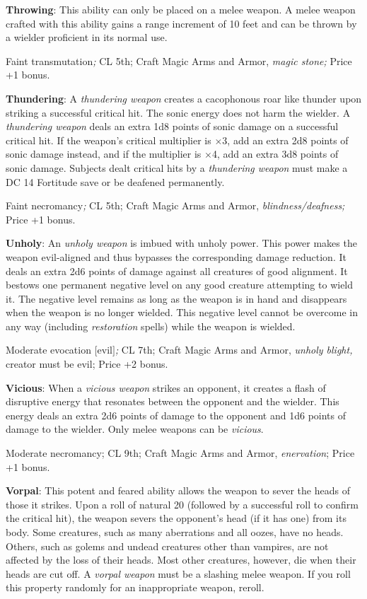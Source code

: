 \textbf{Throwing}: This ability can only be placed on a melee weapon. A melee weapon crafted with this ability gains a range increment of 10 feet and can be thrown by a wielder proficient in its normal use.
				
Faint transmutation\textit{; }CL 5th; Craft Magic Arms and Armor, \textit{magic stone; }Price +1 bonus.
				
\textbf{Thundering}: A \textit{thundering weapon} creates a cacophonous roar like thunder upon striking a successful critical hit. The sonic energy does not harm the wielder. A \textit{thundering weapon} deals an extra 1d8 points of sonic damage on a successful critical hit. If the weapon's critical multiplier is \mbox{$\times$}3, add an extra 2d8 points of sonic damage instead, and if the multiplier is \mbox{$\times$}4, add an extra 3d8 points of sonic damage. Subjects dealt critical hits by a \textit{thundering weapon} must make a DC 14 Fortitude save or be deafened permanently.
				
Faint necromancy\textit{; }CL 5th; Craft Magic Arms and Armor, \textit{blindness/deafness; }Price +1 bonus.
				
\textbf{Unholy}: An \textit{unholy weapon} is imbued with unholy power. This power makes the weapon evil-aligned and thus bypasses the corresponding damage reduction. It deals an extra 2d6 points of damage against all creatures of good alignment. It bestows one permanent negative level on any good creature attempting to wield it. The negative level remains as long as the weapon is in hand and disappears when the weapon is no longer wielded. This negative level cannot be overcome in any way (including \textit{restoration }spells) while the weapon is wielded.
				
Moderate evocation \mbox{$[$}evil\mbox{$]$}\textit{; }CL 7th; Craft Magic Arms and Armor, \textit{unholy blight, }creator must be evil; Price +2 bonus.
				
\textbf{Vicious}: When a \textit{vicious weapon} strikes an opponent, it creates a flash of disruptive energy that resonates between the opponent and the wielder. This energy deals an extra 2d6 points of damage to the opponent and 1d6 points of damage to the wielder. Only melee weapons can be \textit{vicious}.
				
Moderate necromancy; CL 9th; Craft Magic Arms and Armor, \textit{enervation}; Price +1 bonus.
				
\textbf{Vorpal}: This potent and feared ability allows the weapon to sever the heads of those it strikes. Upon a roll of natural 20 (followed by a successful roll to confirm the critical hit), the weapon severs the opponent's head (if it has one) from its body. Some creatures, such as many aberrations and all oozes, have no heads. Others, such as golems and undead creatures other than vampires, are not affected by the loss of their heads. Most other creatures, however, die when their heads are cut off. A \textit{vorpal weapon} must be a slashing melee weapon. If you roll this property randomly for an inappropriate weapon, reroll.
				
